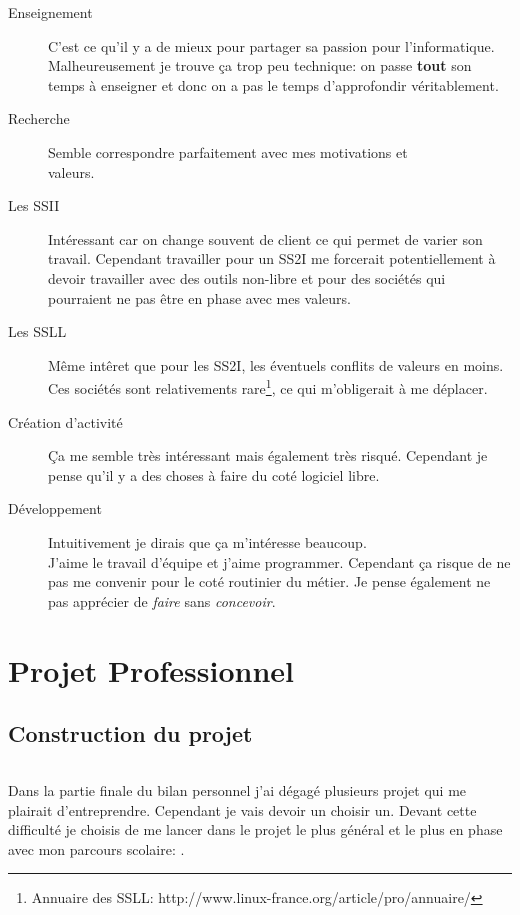\documentclass[a4paper,12pt, draft]{report}
\newcommand{\tabTitle}[1]{\hfill{} \textsc{#1} \hfill{} }
\begin{document}
\begin{description}
\item [Enseignement] C'est ce qu'il y a de mieux pour partager sa passion pour l'informatique. Malheureusement je trouve ça trop peu technique: on passe \textbf{tout} son temps à enseigner et donc on a pas le temps d'approfondir véritablement.

\item [Recherche] Semble correspondre parfaitement avec mes motivations et\\ valeurs.

\item [Les SSII] Intéressant car on change souvent de client ce qui permet de varier son travail. Cependant travailler pour un SS2I me forcerait potentiellement à devoir travailler avec des outils non-libre et pour des sociétés qui pourraient ne pas être en phase avec mes valeurs.

\item [Les SSLL] Même intêret que pour les SS2I, les éventuels conflits de valeurs en moins. Ces sociétés sont relativements rare\footnote{Annuaire des SSLL: http://www.linux-france.org/article/pro/annuaire/}, ce qui m'obligerait à me déplacer.
 
\item [Création d'activité] Ça me semble très intéressant mais également très risqué. Cependant je pense qu'il y a des choses à faire du coté logiciel libre.

\item [Développement] Intuitivement je dirais que ça m'intéresse beaucoup. \\J'aime le travail d'équipe et j'aime programmer. Cependant ça risque de ne pas me convenir pour le coté routinier du métier. Je pense également ne pas apprécier de \textit{faire} sans \textit{concevoir}.
\end{description}


\part{Projet Professionnel}

\chapter{Construction du projet}
\paragraph{}
Dans la partie finale du bilan personnel j'ai dégagé plusieurs projet qui me plairait d'entreprendre. Cependant je vais devoir un choisir un. Devant cette difficulté je choisis de me lancer dans le projet le plus général et le plus en phase avec mon parcours scolaire: \tabTitle{}. \\
\end{document}
